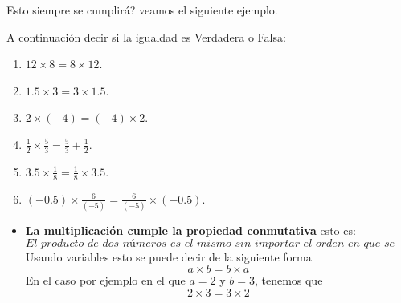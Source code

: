Esto siempre se cumplirá? veamos el siguiente ejemplo.
\begin{ejemplo}
	A continuación decir si la igualdad es Verdadera o Falsa:
	\begin{multicols}{2}
		\begin{enumerate}[label=\Alph*)]
			\item $12\times 8=8\times 12$.
			\item $1.5\times 3=3\times 1.5$.
			\item $2\times(-4)=(-4)\times 2$.
			\item $\frac{1}{2}\times  \frac{5}{3} = \frac{5}{3} + \frac{1}{2}$.
			\item $3.5 \times  \frac{1}{8} = \frac{1}{8} \times 3.5$.			
			\item $(-0.5) \times  \frac{6}{(-5)} = \frac{6}{(-5)} \times (-0.5)$.			
		\end{enumerate}
	\end{multicols}
\end{ejemplo}


\begin{tcolorbox}[colback=red!5!white,colframe=red!75!black]
	\begin{itemize}
		\item \textbf{La multiplicación cumple la propiedad conmutativa} esto es:
		\[
		\textit{El producto de dos números es el mismo sin importar el orden en que se multiplique}
		\]
		Usando variables esto se puede decir de la siguiente forma
		\[
		a\times b=b\times a
		\]
		En el caso por ejemplo en el que $a=2$ y $b=3$, tenemos que 
		\[
		2\times 3=3\times 2
		\]
	\end{itemize}
\end{tcolorbox}




